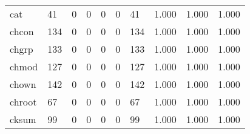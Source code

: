 \begin{longtable}{lp{2.0cm}p{2.0cm}p{2.0cm}p{2.0cm}p{2.0cm}p{2.0cm}p{2.0cm}p{2.0cm}p{2.0cm}}
cat       &                     41 &                                             0 &                                            0 &                                           0 &                                            0 &                                         41 &                                1.000 &                                  1.000 &                                1.000 \\
chcon     &                    134 &                                             0 &                                            0 &                                           0 &                                            0 &                                        134 &                                1.000 &                                  1.000 &                                1.000 \\
chgrp     &                    133 &                                             0 &                                            0 &                                           0 &                                            0 &                                        133 &                                1.000 &                                  1.000 &                                1.000 \\
chmod     &                    127 &                                             0 &                                            0 &                                           0 &                                            0 &                                        127 &                                1.000 &                                  1.000 &                                1.000 \\
chown     &                    142 &                                             0 &                                            0 &                                           0 &                                            0 &                                        142 &                                1.000 &                                  1.000 &                                1.000 \\
chroot    &                     67 &                                             0 &                                            0 &                                           0 &                                            0 &                                         67 &                                1.000 &                                  1.000 &                                1.000 \\
cksum     &                     99 &                                             0 &                                            0 &                                           0 &                                            0 &                                         99 &                                1.000 &                                  1.000 &                                1.000 \\

\end{longtable}
